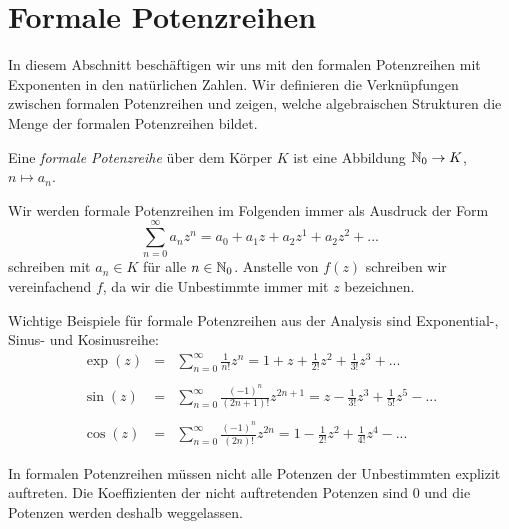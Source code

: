 \section{Formale Potenzreihen}\label{potenzreihenring}

%
In diesem Abschnitt beschäftigen wir uns mit den formalen Potenzreihen mit Exponenten in den natürlichen Zahlen. Wir definieren die Verknüpfungen zwischen formalen Potenzreihen und zeigen, welche algebraischen Strukturen die Menge der formalen Potenzreihen bildet.
  
\begin{defn}
Eine \textit{formale Potenzreihe} über dem Körper $K$ ist eine Abbildung $\mathbb{N}_0 \rightarrow K$, $n \mapsto a_n$.
\end{defn}
\begin{bemnota}
Wir werden formale Potenzreihen im Folgenden immer als Ausdruck der Form
\begin{equation}\label{eq: formalepotenzreihe}
\sum_{n=0}^\infty a_n z^n = a_0 + a_1z + a_2z^1 + a_2z^2 + ...
\end{equation}
schreiben mit $a_n \in K$ für alle $n \in \mathbb{N}_0$.
Anstelle von $f(z)$ schreiben wir vereinfachend $f$, da wir die Unbestimmte immer mit $z$ bezeichnen.
\end{bemnota}
%
%
%
% 
%
%
%
\begin{bsp}
Wichtige Beispiele für formale Potenzreihen aus der Analysis sind Exponential-, Sinus- und Kosinusreihe:
\begin{eqnarray*}
\exp(z) &=& \sum_{n=0}^{\infty} \frac{1}{n!} z^n
= 1 + z +\frac{1}{2!} z^2 + \frac{1}{3!} z^3 + ... \\ \\
\sin(z) &=& \sum_{n= 0}^{\infty} \frac{\left(-1\right)^n}{\left(2n + 1\right)!} z^{2n+1} = z - \frac{1}{3!} z^3 + \frac{1}{5!} z^5 - ...\\\\
\cos(z) &=& \sum_{n= 0}^{\infty} \frac{\left(-1\right)^n}{\left(2n\right)!} z^{2n}
= 1 - \frac{1}{2!} z^2 + \frac{1}{4!} z^4 - ...
\end{eqnarray*}
\end{bsp}
%
\begin{bem}
In formalen Potenzreihen müssen nicht alle Potenzen der Unbestimmten explizit auftreten. Die Koeffizienten der nicht auftretenden Potenzen sind $0$ und die Potenzen werden deshalb weggelassen.
\end{bem}
%
